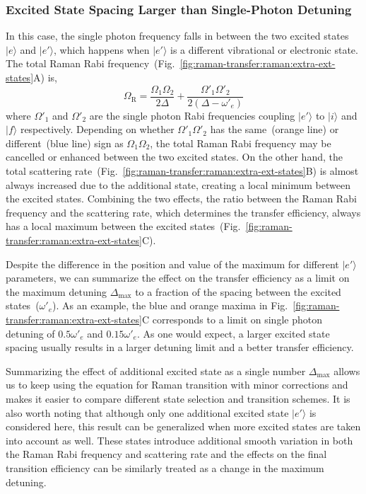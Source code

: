 \subsubsection{Excited State Spacing Larger than Single-Photon Detuning}
\label{ch:raman-transfer:raman:extra-ext:large-spacing}
In this case, the single photon frequency falls in between the two excited states
$|e\rangle$ and $|e'\rangle$,
which happens when $|e'\rangle$ is a different vibrational or electronic state.
The total Raman Rabi frequency~(Fig.~\ref{fig:raman-transfer:raman:extra-ext-states}A) is,
\[
  \Omega_{\mathrm{R}}=\frac{\Omega_1\Omega_2}{2\Delta}+\frac{\Omega'_1\Omega'_2}{2(\Delta-\omega'_e)}
\]
where $\Omega'_1$ and $\Omega'_2$ are the single photon Rabi frequencies coupling $|e'\rangle$
to $|i\rangle$ and $|f\rangle$ respectively.
Depending on whether $\Omega'_1\Omega'_2$ has the same~(orange line)
or different~(blue line) sign as $\Omega_1\Omega_2$, the total Raman Rabi frequency
may be cancelled or enhanced between the two excited states.
On the other hand,
the total scattering rate~(Fig.~\ref{fig:raman-transfer:raman:extra-ext-states}B)
is almost always increased due to the additional state, creating a local minimum
between the excited states.
Combining the two effects, the ratio between the Raman Rabi frequency and
the scattering rate, which determines the transfer efficiency, always has a local maximum
between the excited states~(Fig.~\ref{fig:raman-transfer:raman:extra-ext-states}C).

Despite the difference in the position and value of the maximum for different
$|e'\rangle$ parameters, we can summarize the effect on the transfer efficiency
as a limit on the maximum detuning $\Delta_{\max}$ to a fraction of the spacing
between the excited states~($\omega'_e$).
As an example, the blue and orange maxima in
Fig.~\ref{fig:raman-transfer:raman:extra-ext-states}C
corresponds to a limit on single photon detuning of $0.5\omega'_e$ and $0.15\omega'_e$.
As one would expect, a larger excited state spacing usually results in
a larger detuning limit and a better transfer efficiency.

Summarizing the effect of additional excited state as a single number $\Delta_{\max}$ allows
us to keep using the equation for Raman transition with minor corrections
and makes it easier to compare different state selection and transition schemes.
It is also worth noting that although only one additional excited state $|e'\rangle$
is considered here, this result can be generalized when more excited states are taken into account
as well. These states introduce additional smooth variation in both the Raman Rabi frequency
and scattering rate and the effects on the final transition efficiency can be similarly
treated as a change in the maximum detuning.

